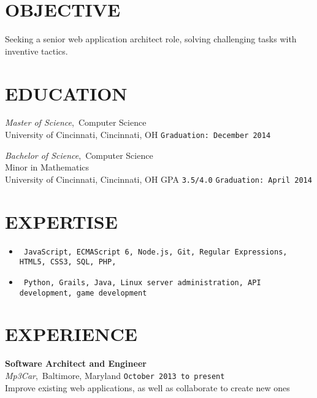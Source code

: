 \documentclass[11pt, line]{res}
\begin{document}
	\address{8228 Melrose Ln\\ Maineville, OH 45039\\ 513-259-0656\\ ross@rhadden.com}

	\begin{resume}
		\vspace{-16pt}
		\section{OBJECTIVE}
			Seeking a senior web application architect role, solving challenging tasks with inventive tactics.

		\section{EDUCATION}
				\textit{Master of Science},\, Computer Science \\
				University of Cincinnati, Cincinnati, OH
					\hfill \texttt{Graduation: December 2014}

			\vspace{-2pt}
				\textit{Bachelor of Science},\, Computer Science \\
				Minor in Mathematics \\
				University of Cincinnati, Cincinnati, OH
					\hspace{16pt} GPA \texttt{3.5/4.0}
					\hfill \texttt{Graduation: April 2014}

		\section{EXPERTISE}
			\begin{itemize}[leftmargin=0pt]
				\item[]
				\texttt{
					JavaScript,
					ECMAScript 6,
					Node.js,
					Git,
					Regular Expressions,
					HTML5,
					CSS3,
					SQL,
					PHP,
				}
				\item[]
				\texttt{
					Python,
					Grails,
					Java,
					Linux server administration,
					API development,
					game development
				}
			\end{itemize}

		\section{EXPERIENCE}
				\textbf{Software Architect and Engineer} \\
				\textit{Mp3Car},\, Baltimore, Maryland
					\hfill \texttt{October 2013 to present} \\
				Improve existing web applications, as well as collaborate to create new ones


\end{resume}
\end{document}
